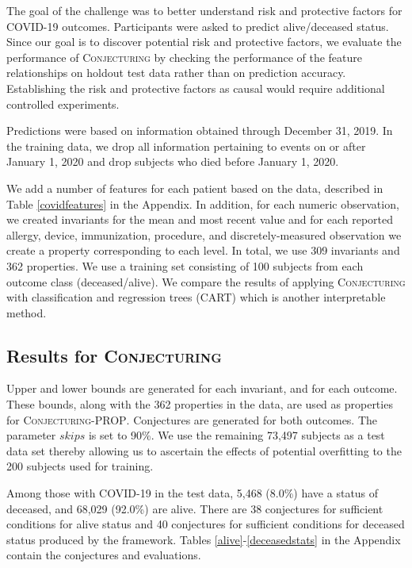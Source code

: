 \documentclass[ijds,nonblindrev]{informs-ijds}
\begin{document}
The goal of the challenge was to better understand risk and protective factors for COVID-19 outcomes.   Participants were asked to predict alive/deceased status.  Since our goal is to discover potential risk and protective factors, we evaluate the performance of \textsc{Conjecturing} by checking the performance of the feature relationships on holdout test data rather than on prediction accuracy.  Establishing the risk and protective factors as causal would require additional controlled experiments.  

Predictions were based on information obtained through December 31, 2019.  In the training data, we drop all information pertaining to events on or after January 1, 2020 and drop subjects who died before January 1, 2020.  

We add a number of features for each patient based on the data, described in Table \ref{covidfeatures} in the Appendix.  In addition, for each numeric observation, we created  invariants for the mean and most recent value and for each reported allergy, device, immunization, procedure, and discretely-measured observation we create a property corresponding to each level.  In total, we use 309 invariants and 362 properties.  We use a training set consisting of 100 subjects from each outcome class (deceased/alive). We compare the results of applying \textsc{Conjecturing} with classification and regression trees (CART) \cite{breiman84} which is another interpretable method.  

\subsection{Results for \textsc{Conjecturing}}

Upper and lower bounds are generated for each invariant, and for each outcome.   These bounds, along with the 362 properties in the data, are used as properties for \textsc{Conjecturing-PROP}.  Conjectures are generated for both outcomes.  The parameter $skips$ is set to 90\%.  We use the remaining 73,497 subjects as a test data set thereby allowing us to ascertain the effects of potential overfitting to the 200 subjects used for training.  

Among those with COVID-19 in the test data, 5,468 (8.0\%) have a status of deceased, and 68,029 (92.0\%) are alive.  There are 38 conjectures for sufficient conditions for alive status and 40 conjectures for sufficient conditions for deceased status produced by the framework.  Tables \ref{alive}-\ref{deceasedstats} in the Appendix contain the conjectures and evaluations.
\end{document}
